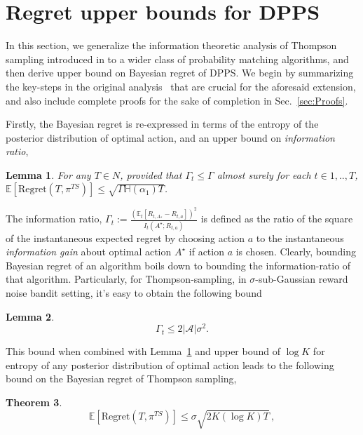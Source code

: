 \documentclass[10pt]{article}
\newtheorem{thm}{Theorem}
\newtheorem{lemma}[thm]{Lemma}
\def\E{\mathbb{E}}
\begin{document}
\section{Regret upper bounds for DPPS} \label{sec:Theoretcial-analysis}
In this section, we generalize the information theoretic analysis of Thompson sampling introduced in \cite{russo2016information} to a wider class of probability matching algorithms, and then derive upper bound on Bayesian regret of DPPS. We begin by summarizing the key-steps in the original analysis~\citep{russo2016information} that are crucial for the aforesaid extension, and also include complete proofs for the sake of completion in Sec.~\ref{sec:Proofs}. 

Firstly, the Bayesian regret is re-expressed in terms of the entropy of the posterior distribution of optimal action, and an upper bound on \textit{information ratio}, 

\begin{lemma}\label{fact:Bayesian-regret-information-ratio}
For any $T \in N$, provided that $\Gamma_{t} \le \Gamma$ almost surely for each $t \in {1,..,T}$, $\E\left[\mathrm{Regret}(T,\pi^{TS})\right] \le \sqrt{\Gamma \mathbb{H}(\alpha_{1}) T}$.
\end{lemma}

The information ratio, $\Gamma_{t} := \frac{(\E_t[R_{t,A_*} - R_{t,a}])^{2}}{I_{t}(A^\star;R_{t,a})}$ is defined as the  ratio of the square of the instantaneous expected regret by choosing action $a$ to the instantaneous \textit{information gain} about optimal action $A^\star$ if action $a$ is chosen. Clearly, bounding Bayesian regret of an algorithm boils down to bounding the information-ratio of that algorithm. Particularly, for Thompson-sampling,  in $\sigma$-sub-Gaussian reward noise bandit setting, it's easy to obtain the following bound 


\begin{lemma}\label{fact:Information-ratio-MAB-for-sub-gaussian-rewards}
\[
\Gamma_{t} \le 2|\mathcal{A}|\sigma^{2}.
\]
\end{lemma}

This bound when combined with Lemma~\ref{fact:Bayesian-regret-information-ratio} and upper bound of $\log K$ for entropy of any posterior distribution of optimal action leads to the following bound on the Bayesian regret of Thompson sampling,

\begin{thm}
\label{thm:TS-Bayesian-regret}
\[\E\left[\mathrm{Regret}(T,\pi^{TS})\right] \le \sigma\sqrt{2{K}(\log{K})T}\,,\]
\end{thm}
\end{document}
